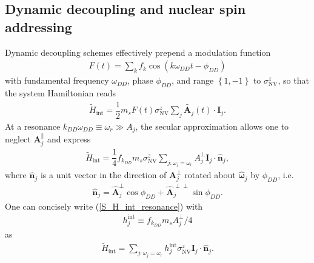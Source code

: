 \documentclass[twocolumn]{revtex4-1}
\renewcommand{\t}{\text} %
\newcommand{\f}[2]{\dfrac{#1}{#2}} %
\newcommand{\p}[1]{\left(#1\right)} %
\renewcommand{\set}[1]{\left\{#1\right\}} %
\renewcommand{\v}{\bm} %
\newcommand{\uv}[1]{\hat{\v{#1}}} %
\renewcommand{\c}{\cdot} %
\newcommand{\NV}{\t{NV}}
\begin{document}
\subsection{Dynamic decoupling and nuclear spin addressing}

Dynamic decoupling schemes effectively prepend a modulation function
\begin{align}
  F\p{t}=\sum_kf_k\cos\p{k\omega_{DD}t-\phi_{DD}}
\end{align}
with fundamental frequency $\omega_{DD}$, phase $\phi_{DD}$, and range
$\set{1,-1}$ to $\sigma_\NV^z$, so that the system Hamiltonian reads
\begin{align}
  \tilde H_\t{int} =
  \f12m_sF\p{t}\sigma_\NV^z\sum_j\tilde{\v A_j}\p{t}\c\v I_j.
\end{align}
At a resonance $k_{DD}\omega_{DD}\equiv\omega_r\gg A_j$, the secular
approximation allows one to neglect $\v A_j^\parallel$ and express
\begin{align}
  \tilde H_\t{int} = \f14 f_{k_{DD}} m_s\sigma_\NV^z
  \sum_{j:\omega_j=\omega_r} A_j^\perp\v I_j\c\uv n_j,
  \label{S_H_int_resonance}
\end{align}
where $\uv n_j$ is a unit vector in the direction of $\v A_j^\perp$
rotated about $\uv\omega_j$ by $\phi_{DD}$, i.e.
\begin{align}
  \uv n_j = \uv A_j^\perp\cos\phi_{DD} +
  \uv A_j^{\perp\perp}\sin\phi_{DD}.
\end{align}
One can concisely write (\ref{S_H_int_resonance}) with
\begin{align}
  h_j^\t{int}\equiv f_{k_{DD}}m_sA_j^\perp/4
\end{align}
as
\begin{align}
  \tilde H_\t{int} = \sum_{j:\omega_j=\omega_r}
  h_j^\t{int}\sigma_\NV^z\v I_j\c\uv n_j.
  \label{S_H_int}
\end{align}
\end{document}
